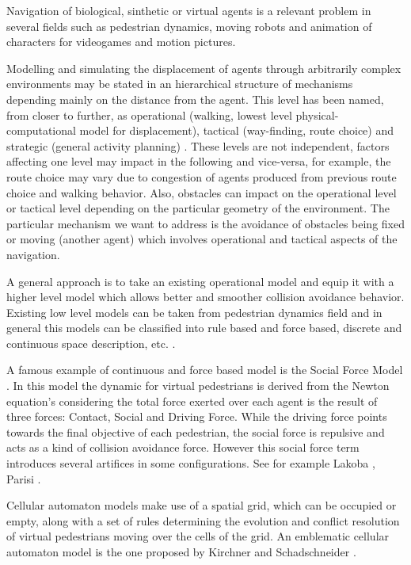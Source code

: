 \documentclass[english]{article}
\begin{document}
Navigation of biological, sinthetic or virtual agents is a relevant
problem in several fields such as pedestrian dynamics, moving robots
and animation of characters for videogames and motion pictures.

Modelling and simulating the displacement of agents through arbitrarily
complex environments may be stated in an hierarchical structure of
mechanisms depending mainly on the distance from the agent. This level
has been named, from closer to further, as operational (walking, lowest
level physical-computational model for displacement), tactical (way-finding,
route choice) and strategic (general activity planning) \cite{key-hoog2004}.
These levels are not independent, factors affecting one level may
impact in the following and vice-versa, for example, the route choice
may vary due to congestion of agents produced from previous route
choice and walking behavior. Also, obstacles can impact on the operational
level or tactical level depending on the particular geometry of the
environment. The particular mechanism we want to address is the avoidance
of obstacles being fixed or moving (another agent) which involves
operational and tactical aspects of the navigation.

A general approach is to take an existing operational model and equip
it with a higher level model which allows better and smoother collision
avoidance behavior. Existing low level models can be taken from pedestrian
dynamics field and in general this models can be classified into rule
based and force based, discrete and continuous space description,
etc. \cite{key-scha2009}.

A famous example of continuous and force based model is the Social
Force Model \cite{key-helb1995,key-helb2000}. In this model the dynamic
for virtual pedestrians is derived from the Newton equation's considering
the total force exerted over each agent is the result of three forces:
Contact, Social and Driving Force. While the driving force points
towards the final objective of each pedestrian, the social force is
repulsive and acts as a kind of collision avoidance force. However
this social force term introduces several artifices in some configurations.
See for example Lakoba \cite{key-tara2005}, Parisi \cite{key-pari2009}.

Cellular automaton models make use of a spatial grid, which can be
occupied or empty, along with a set of rules determining the evolution
and conflict resolution of virtual pedestrians moving over the cells
of the grid. An emblematic cellular automaton model is the one proposed
by Kirchner and Schadschneider \cite{key-kirc2002}.
\end{document}
